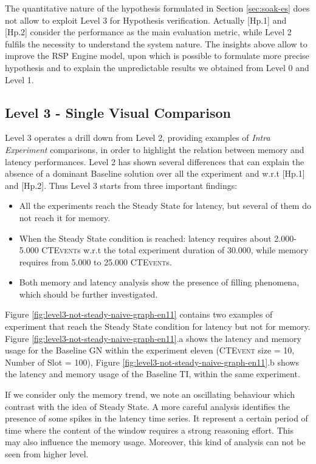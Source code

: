 The quantitative nature of the hypothesis formulated in Section \ref{sec:soak-es} does not allow to exploit Level 3 for Hypothesis verification. Actually [Hp.1] and [Hp.2] consider the performance as the main evaluation metric, while Level 2 fulfils the necessity to understand the system nature. The insights above allow to improve the RSP Engine model, upon which is possible to formulate more precise hypothesis and to explain the unpredictable results we obtained from Level 0 and Level 1.

\subsection{Level 3 - Single Visual Comparison}\label{sec:eval-level3}
	
Level 3 operates a drill down from Level 2, providing examples of \textit{Intra Experiment} comparisons, in order to highlight the relation between memory and latency performances. Level 2 has shown several differences that can explain the absence of a dominant Baseline solution over all the experiment and w.r.t [Hp.1] and [Hp.2]. Thus Level 3 starts from three important findings:
\begin{itemize}
\item All the experiments reach the Steady State for latency, but several of them do not reach it for memory.
\item When the Steady State condition is reached: latency requires about 2.000-5.000 \textsc{CTEvent}s w.r.t the total experiment duration of 30.000, while memory requires from 5.000 to 25.000 \textsc{CTEvent}s.
\item Both memory and latency analysis show the presence of filling phenomena, which should be further investigated.
\end{itemize}

Figure \ref{fig:level3-not-steady-naive-graph-en11} contains two examples of experiment that reach the Steady State condition for latency but not for memory. Figure \ref{fig:level3-not-steady-naive-graph-en11}.a shows the latency and memory usage for the Baseline GN within the experiment eleven (\textsc{CTEvent} size = 10, Number of Slot = 100), Figure \ref{fig:level3-not-steady-naive-graph-en11}.b shows the latency and memory usage of the Baseline TI, within the same experiment. 

If we consider only the memory trend, we note an oscillating behaviour which contrast with the idea of Steady State. A more careful analysis identifies the presence of some spikes in the latency time series. It represent a certain period of time where the content of the window requires a strong reasoning effort. This may also influence the memory usage. Moreover, this kind of analysis can not be seen from higher level. 

